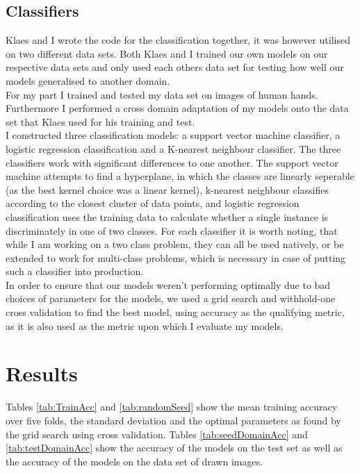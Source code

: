 \documentclass[11pt, a4paper]{article}
\begin{document}
\subsection{Classifiers}
Klaes and I wrote the code for the classification together, it was however utilised on two different data sets. Both Klaes and I trained our own models on our respective data sets and only used each others data set for testing how well our models generalised to another domain.\\
For my part I trained and tested my data set on images of human hands. Furthermore I performed a cross domain adaptation of my models onto the data set that Klaes used for his training and test.\\

I constructed three classification models: a support vector machine classifier, a logistic regression classification and a K-nearest neighbour classifier. The three classifiers work with significant differences to one another. The support vector machine attempts to find a hyperplane, in which the classes are linearly seperable (as the best kernel choice was a linear kernel), k-nearest neighbour classifies according to the closest cluster of data points, and logistic regression classification uses the training data to calculate whether a single instance is discriminately in one of two classes. For each classifier it is worth noting, that while I am working on a two class problem, they can all be used natively, or be extended to work for multi-class problems, which is necessary in case of putting such a classifier into production.\\
In order to ensure that our models weren't performing optimally due to bad choices of parameters for the models, we used a grid search and withhold-one cross validation to find the best model, using accuracy as the qualifying metric, as it is also used as the metric upon which I evaluate my models.\\
\section{Results}
Tables \ref{tab:TrainAcc} and \ref{tab:randomSeed} show the mean training accuracy over five folds, the standard deviation and the optimal parameters as found by the grid search using cross validation. Tables \ref{tab:seedDomainAcc} and \ref{tab:testDomainAcc} show the accuracy of the models on the test set as well as the accuracy of the models on the data set of drawn images. \\
\end{document}
